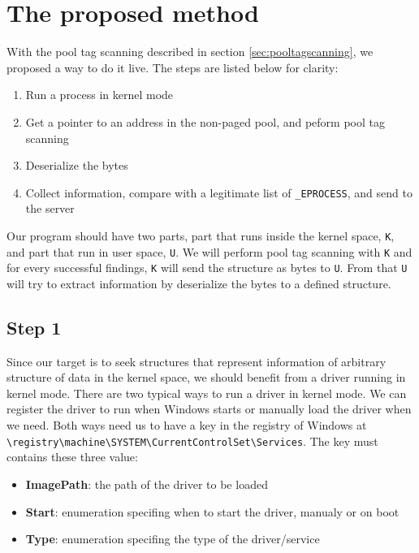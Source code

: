 \chapter[The proposed method]{The proposed method}

With the pool tag scanning described in section \ref{sec:pooltagscanning}, we proposed a way to do it live. The steps are listed below for clarity:

\begin{enumerate} %
  \item Run a process in kernel mode
  \item Get a pointer to an address in the non-paged pool, and peform pool tag scanning
  \item Deserialize the bytes
  \item Collect information, compare with a legitimate list of \texttt{\_EPROCESS}, and send to the server
\end{enumerate}

Our program should have two parts, part that runs inside the kernel space, \texttt{K}, and part that run in user space, \texttt{U}. We will perform pool tag scanning with \texttt{K} and for every successful findings, \texttt{K} will send the structure as bytes to \texttt{U}. From that \texttt{U} will try to extract information by deserialize the bytes to a defined structure.

\section[Step 1]{Step 1}

Since our target is to seek structures that represent information of arbitrary structure of data in the kernel space, we should benefit from a driver running in kernel mode. There are two typical ways to run a driver in kernel mode. We can register the driver to run when Windows starts or manually load the driver when we need. Both ways need us to have a key in the registry of Windows at \texttt{\textbackslash registry\textbackslash machine\textbackslash SYSTEM\textbackslash CurrentControlSet\textbackslash Services}. The key must contains these three value:

\begin{itemize}
  \item \textbf{ImagePath}: the path of the driver to be loaded
  \item \textbf{Start}: enumeration specifing when to start the driver, manualy or on boot
  \item \textbf{Type}: enumeration specifing the type of the driver/service
\end{itemize}

